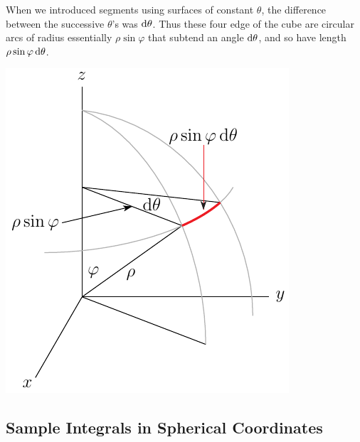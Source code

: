 \begin{itemize}
\begin{efig}
\begin{center}
\end{center}
\end{efig}
When we introduced segments using surfaces of constant $\theta$, 
the difference between the successive $\theta$'s was $\mathrm{d}\theta$.
Thus these four edge of the cube are circular arcs of radius 
essentially $\rho\sin\varphi$ that subtend an angle $\mathrm{d}\theta$, and so
have length $\rho\sin\varphi\,\mathrm{d}\theta$.
\begin{efig}
\begin{center}
    \includegraphics[scale=0.8]{../figs_coord/spher10.pdf}
\end{center}
\end{efig}
\end{itemize}



\subsection{Sample Integrals in Spherical Coordinates} \label{sec spherical eg}


